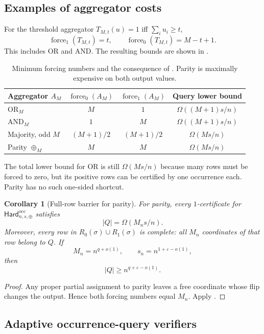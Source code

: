 \documentclass[11pt]{article}
\newtheorem{corollary}[theorem]{Corollary}
\theoremstyle{definition}
\newcommand{\Force}{\operatorname{force}}
\newcommand{\eps}{\varepsilon}
\newcommand{\HardO}{\mathsf{Hard}^{\mathrm{occ}}}
\begin{document}
\subsection{Examples of aggregator costs}

For the threshold aggregator $T_{M,t}(u)=1$ iff $\sum_i u_i\ge t$,
\[
  \Force_1(T_{M,t})=t,
  \qquad
  \Force_0(T_{M,t})=M-t+1.
\]
This includes OR and AND.  The resulting bounds are shown in .

\begin{table}[H]
\centering
\small
\begin{tabular}{@{}lccc@{}}
\toprule
Aggregator $A_M$ & $\Force_0(A_M)$ & $\Force_1(A_M)$ & Query lower bound \\
\midrule
$\mathrm{OR}_M$ & $M$ & $1$ & $\Omega((M+1)s/n)$ \\
$\mathrm{AND}_M$ & $1$ & $M$ & $\Omega((M+1)s/n)$ \\
Majority, odd $M$ & $(M+1)/2$ & $(M+1)/2$ & $\Omega(Ms/n)$ \\
Parity $\oplus_M$ & $M$ & $M$ & $\Omega(Ms/n)$ \\
\bottomrule
\end{tabular}
\caption{Minimum forcing numbers and the consequence of .  Parity is maximally expensive on both output values.}
\label{tab:aggregators}
\end{table}

The total lower bound for OR is still $\Omega(Ms/n)$ because many rows must be forced to zero, but its positive rows can be certified by one occurrence each.  Parity has no such one-sided shortcut.

\begin{corollary}[Full-row barrier for parity]\label{cor:full-row}
For parity, every $1$-certificate for $\HardO_{n,s,\oplus}$ satisfies
\[
  |Q|=\Omega(M_ns/n).
\]
Moreover, every row in $R_0(\sigma)\cup R_1(\sigma)$ is complete: all $M_n$ coordinates of that row belong to $Q$.
If
\[
  M_n=n^{q+o(1)},
  \qquad
  s_n=n^{1+\eps-o(1)},
\]
then
\[
  |Q|\ge n^{q+\eps-o(1)}.
\]
\end{corollary}

\begin{proof}
Any proper partial assignment to parity leaves a free coordinate whose flip changes the output.  Hence both forcing numbers equal $M_n$.  Apply .
\end{proof}

\subsection{Adaptive occurrence-query verifiers}
\end{document}
